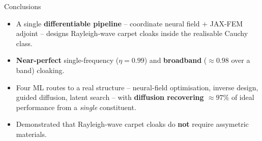 \documentclass[aspectratio=169, 10pt]{beamer}
\begin{document}
\begin{frame}{Conclusions}
  \footnotesize
  \begin{itemize}
    \setlength{\itemsep}{0.45em}
    \item A single \textbf{differentiable pipeline} -- coordinate neural field
          $+$ JAX-FEM adjoint -- designs Rayleigh-wave carpet cloaks inside the
          realisable Cauchy class.
    \item \textbf{Near-perfect} single-frequency ($\eta=0.99$) and \textbf{broadband}
          ($\approx0.98$ over a band) cloaking.
    \item Four ML routes to a real structure -- neural-field optimisation,
          inverse design, guided diffusion, latent search -- with
          \textbf{diffusion recovering $\approx97\%$} of ideal performance from a
          \emph{single} constituent.
    \item Demonstrated that Rayleigh-wave carpet cloaks do \textbf{not} require assymetric materials.
  \end{itemize}
  \vspace{0.6em}
\end{frame}
\end{document}
